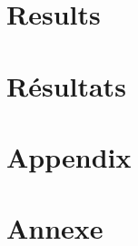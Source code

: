 \documentclass[12pt]{report}
\begin{document}
\ml
{\chapter{Results}}
{\chapter{Résultats}}



\appendix

\ml
{\chapter{Appendix}}
{\chapter{Annexe}}
\pagebreak





\singlespacing


\end{document}
